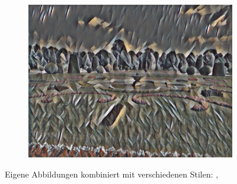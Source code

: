 \begin{figure}[H]
\begin{subfigure}[h]{0.32\textwidth}
        \includegraphics[width=\textwidth]{resources/content/experiments/garden-vgg16_still_life_with_liqueur_bottle.jpg}
    \end{subfigure}

    \caption{Eigene Abbildungen kombiniert mit verschiedenen Stilen: \cite{multicolored_abstract_artwork_img}, \cite{still_life_with_liqueur_bottle_img}}
    \label{img:trained_models2}
\end{figure}

\pagebreak
{}

